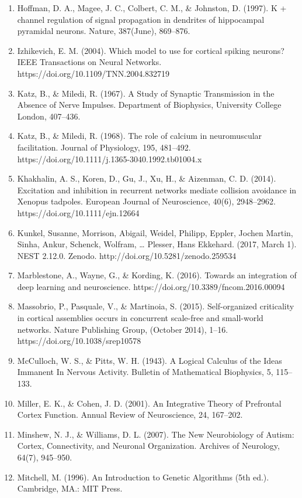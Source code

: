 \documentclass[11pt]{article}
\begin{document}
\begin{enumerate}
\item Hoffman, D. A., Magee, J. C., Colbert, C. M., \& Johnston, D. (1997). K + channel regulation of signal propagation in dendrites of hippocampal pyramidal neurons. Nature, 387(June), 869–876.
\item Izhikevich, E. M. (2004). Which model to use for cortical spiking neurons? IEEE Transactions on Neural Networks. https://doi.org/10.1109/TNN.2004.832719
\item Katz, B., \& Miledi, R. (1967). A Study of Synaptic Transmission in the Absence of Nerve Impulses. Department of Biophysics, University College London, 407–436.
\item Katz, B., \& Miledi, R. (1968). The role of calcium in neuromuscular facilitation. Journal of Physiology, 195, 481–492. https://doi.org/10.1111/j.1365-3040.1992.tb01004.x
\item Khakhalin, A. S., Koren, D., Gu, J., Xu, H., \& Aizenman, C. D. (2014). Excitation and inhibition in recurrent networks mediate collision avoidance in Xenopus tadpoles. European Journal of Neuroscience, 40(6), 2948–2962. https://doi.org/10.1111/ejn.12664
\item Kunkel, Susanne, Morrison, Abigail, Weidel, Philipp, Eppler, Jochen Martin, Sinha, Ankur, Schenck, Wolfram, … Plesser, Hans Ekkehard. (2017, March 1). NEST 2.12.0. Zenodo. http://doi.org/10.5281/zenodo.259534
\item Marblestone, A., Wayne, G., \& Kording, K. (2016). Towards an integration of deep learning and neuroscience. https://doi.org/10.3389/fncom.2016.00094
\item Massobrio, P., Pasquale, V., \& Martinoia, S. (2015). Self-organized criticality in cortical assemblies occurs in concurrent scale-free and small-world networks. Nature Publishing Group, (October 2014), 1–16. https://doi.org/10.1038/srep10578
\item McCulloch, W. S., \& Pitts, W. H. (1943). A Logical Calculus of the Ideas Immanent In Nervous Activity. Bulletin of Mathematical Biophysics, 5, 115–133.
\item Miller, E. K., \& Cohen, J. D. (2001). An Integrative Theory of Prefrontal Cortex Function. Annual Review of Neuroscience, 24, 167–202.
\item Minshew, N. J., \& Williams, D. L. (2007). The New Neurobiology of Autism: Cortex, Connectivity, and Neuronal Organization. Archives of Neurology, 64(7), 945–950.
\item Mitchell, M. (1996). An Introduction to Genetic Algorithms (5th ed.). Cambridge, MA.: MIT Press.

\end{enumerate}
\end{document}
